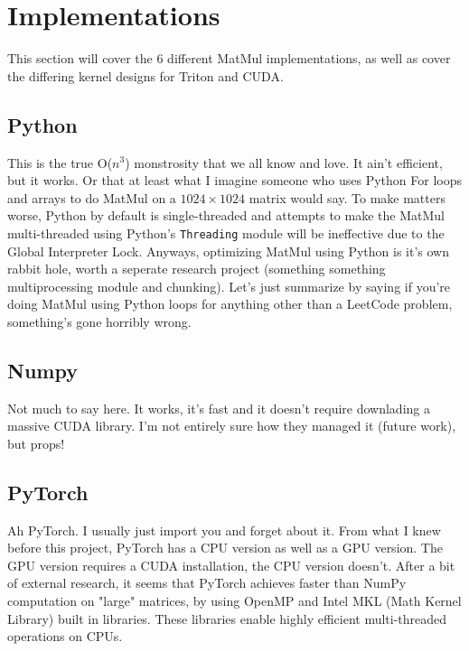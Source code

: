 \documentclass[11pt,letterpaper]{article}
\begin{document}
\section{Implementations}
This section will cover the 6 different MatMul implementations, as well as cover the differing kernel designs for Triton and CUDA.

\subsection{Python}
This is the true O($n^{3}$) monstrosity that we all know and love. It ain't efficient, but it works. Or that at least what I imagine someone who uses Python For loops and arrays to do MatMul on a $1024 \times 1024$ matrix would say. To make matters worse, Python by default is single-threaded and attempts to make the MatMul multi-threaded using Python's \texttt{Threading} module will be ineffective due to the Global Interpreter Lock. Anyways, optimizing MatMul using Python is it's own rabbit hole, worth a seperate research project (something something multiprocessing module and chunking). Let's just summarize by saying if you're doing MatMul using Python loops for anything other than a LeetCode problem, something's gone horribly wrong.

\subsection{Numpy}
Not much to say here. It works, it's fast and it doesn't require downlading a massive CUDA library. I'm not entirely sure how they managed it (future work), but props!

\subsection{PyTorch}
Ah PyTorch. I usually just import you and forget about it. From what I knew before this project, PyTorch has a CPU version as well as a GPU version. The GPU version requires a CUDA installation, the CPU version doesn't. After a bit of external research, it seems that PyTorch achieves faster than NumPy computation on "large" matrices, by using OpenMP and Intel MKL (Math Kernel Library) built in libraries. These libraries enable highly efficient multi-threaded operations on CPUs. 
\end{document}
